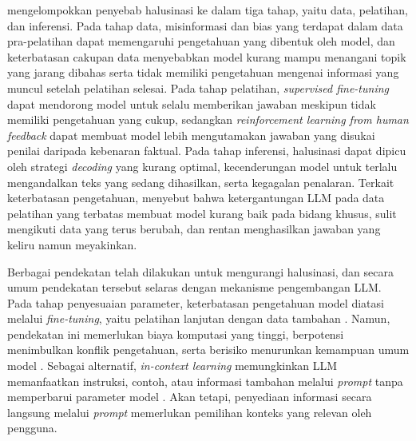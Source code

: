 \textcite{Huang2025} mengelompokkan penyebab halusinasi ke dalam tiga tahap, yaitu data, pelatihan, dan inferensi. Pada tahap data, misinformasi dan bias yang terdapat dalam data pra-pelatihan dapat memengaruhi pengetahuan yang dibentuk oleh model, dan keterbatasan cakupan data menyebabkan model kurang mampu menangani topik yang jarang dibahas serta tidak memiliki pengetahuan mengenai informasi yang muncul setelah pelatihan selesai. Pada tahap pelatihan, \emph{supervised fine-tuning} dapat mendorong model untuk selalu memberikan jawaban meskipun tidak memiliki pengetahuan yang cukup, sedangkan \emph{reinforcement learning from human feedback} dapat membuat model lebih mengutamakan jawaban yang disukai penilai daripada kebenaran faktual. Pada tahap inferensi, halusinasi dapat dipicu oleh strategi \emph{decoding} yang kurang optimal, kecenderungan model untuk terlalu mengandalkan teks yang sedang dihasilkan, serta kegagalan penalaran. Terkait keterbatasan pengetahuan, \textcite{YizhengHuang2026} menyebut bahwa ketergantungan LLM pada data pelatihan yang terbatas membuat model kurang baik pada bidang khusus, sulit mengikuti data yang terus berubah, dan rentan menghasilkan jawaban yang keliru namun meyakinkan.

Berbagai pendekatan telah dilakukan untuk mengurangi halusinasi, dan secara umum pendekatan tersebut selaras dengan mekanisme pengembangan LLM. Pada tahap penyesuaian parameter, keterbatasan pengetahuan model diatasi melalui \emph{fine-tuning}, yaitu pelatihan lanjutan dengan data tambahan \autocite{Hendawi2026}. Namun, pendekatan ini memerlukan biaya komputasi yang tinggi, berpotensi menimbulkan konflik pengetahuan, serta berisiko menurunkan kemampuan umum model \autocite{WangXL2026}. Sebagai alternatif, \emph{in-context learning} memungkinkan LLM memanfaatkan instruksi, contoh, atau informasi tambahan melalui \emph{prompt} tanpa memperbarui parameter model \autocite{Patil2024, Hendawi2026}. Akan tetapi, penyediaan informasi secara langsung melalui \emph{prompt} memerlukan pemilihan konteks yang relevan oleh pengguna.

